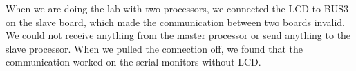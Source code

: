When we are doing the lab with two processors, we connected the LCD to BUS3 on the slave board, which made the communication between two boards invalid. We could not receive anything from the master processor or send anything to the slave processor. When we pulled the connection off, we found that the communication worked on the serial monitors without LCD. 